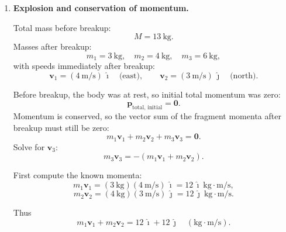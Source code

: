 \documentclass[../main.tex]{subfiles}
\begin{document}
\begin{enumerate}
\begin{enumerate}
    Now evaluate the minimum distance. First compute $D^2$ at $t = 17/25$:
    \[
    D^2\!\left(\frac{17}{25}\right)
    = 25\left(\frac{17}{25}\right)^2 
    - 34\left(\frac{17}{25}\right)
    + 13.
    \]

    Compute term by term:
    \[
    \left(\frac{17}{25}\right)^2 = \frac{289}{625},
    \quad
    25 \cdot \frac{289}{625} = \frac{7225}{625} = 11.56.
    \]
    Next:
    \[
    34 \cdot \frac{17}{25} = \frac{578}{25} = 23.12.
    \]
    So
    \[
    D^2\!\left(\frac{17}{25}\right)
    = 11.56 - 23.12 + 13
    = 1.44.
    \]

    Therefore
    \[
    D_\text{min} = \sqrt{1.44} = 1.2~\text{m}.
    \]

    Summary: the two particles are closest at
    \[
    t = \frac{17}{25}~\text{s} = 0.68~\text{s},
    \qquad
    D_\text{min} = 1.2~\text{m}.
    \]

    Interpretation: since both have constant (but different) velocities, their relative motion is uniform, so the closest approach happens when the line between them is perpendicular to the relative velocity.
\end{enumerate}


\item \textbf{Explosion and conservation of momentum.}

Total mass before breakup:
\[
M = 13~\text{kg}.
\]
Masses after breakup:
\[
m_1 = 3~\text{kg}, \quad m_2 = 4~\text{kg}, \quad m_3 = 6~\text{kg},
\]
with speeds immediately after breakup:
\[
\mathbf{v}_1 = (4~\text{m/s})\,\hat{\imath} \quad \text{(east)},
\qquad
\mathbf{v}_2 = (3~\text{m/s})\,\hat{\jmath} \quad \text{(north)}.
\]

Before breakup, the body was at rest, so initial total momentum was zero:
\[
\mathbf{p}_\text{total, initial} = \mathbf{0}.
\]
Momentum is conserved, so the vector sum of the fragment momenta after breakup must still be zero:
\[
m_1 \mathbf{v}_1 + m_2 \mathbf{v}_2 + m_3 \mathbf{v}_3 = \mathbf{0}.
\]
Solve for $\mathbf{v}_3$:
\[
m_3 \mathbf{v}_3 = - \left( m_1 \mathbf{v}_1 + m_2 \mathbf{v}_2 \right).
\]

First compute the known momenta:
\[
m_1 \mathbf{v}_1 = (3~\text{kg})(4~\text{m/s})\,\hat{\imath}
= 12\,\hat{\imath}~\text{kg}\cdot\text{m/s},
\]
\[
m_2 \mathbf{v}_2 = (4~\text{kg})(3~\text{m/s})\,\hat{\jmath}
= 12\,\hat{\jmath}~\text{kg}\cdot\text{m/s}.
\]

Thus
\[
m_1 \mathbf{v}_1 + m_2 \mathbf{v}_2
= 12\,\hat{\imath} + 12\,\hat{\jmath}
\quad (\text{kg}\cdot\text{m/s}).
\]


\end{enumerate}
\end{document}
